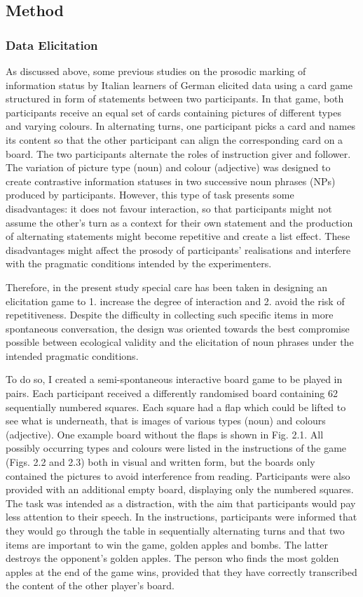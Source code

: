 \subsection{Method}
\hypertarget{Toc191305891}{}\subsubsection{Data Elicitation}
\hypertarget{Toc191305892}{}
As discussed above, some previous studies on the prosodic marking of information status by Italian learners of German elicited data using a card game structured in form of statements between two participants. In that game, both participants receive an equal set of cards containing pictures of different types and varying colours. In alternating turns, one participant picks a card and names its content so that the other participant can align the corresponding card on a board. The two participants alternate the roles of instruction giver and follower. The variation of picture type (noun) and colour (adjective) was designed to create contrastive information statuses in two successive noun phrases (NPs) produced by participants. However, this type of task presents some disadvantages: it does not favour interaction, so that participants might not assume the other’s turn as a context for their own statement and the production of alternating statements might become repetitive and create a list effect. These disadvantages might affect the prosody of participants’ realisations and interfere with the pragmatic conditions intended by the experimenters.

Therefore, in the present study special care has been taken in designing an elicitation game to 1. increase the degree of interaction and 2. avoid the risk of repetitiveness. Despite the difficulty in collecting such specific items in more spontaneous conversation, the design was oriented towards the best compromise possible between ecological validity and the elicitation of noun phrases under the intended pragmatic conditions.

To do so, I created a semi-spontaneous interactive board game to be played in pairs. Each participant received a differently randomised board containing 62 sequentially numbered squares. Each square had a flap which could be lifted to see what is underneath, that is images of various types (noun) and colours (adjective). One example board without the flaps is shown in Fig. 2.1. All possibly occurring types and colours were listed in the instructions of the game (Figs. 2.2 and 2.3) both in visual and written form, but the boards only contained the pictures to avoid interference from reading. Participants were also provided with an additional empty board, displaying only the numbered squares. The task was intended as a distraction, with the aim that participants would pay less attention to their speech. In the instructions, participants were informed that they would go through the table in sequentially alternating turns and that two items are important to win the game, golden apples and bombs. The latter destroys the opponent’s golden apples. The person who finds the most golden apples at the end of the game wins, provided that they have correctly transcribed the content of the other player’s board.

